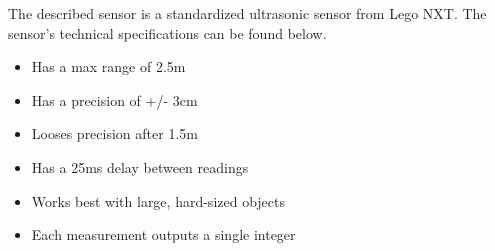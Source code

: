 
The described sensor is a standardized ultrasonic sensor from Lego NXT. The
sensor's technical specifications \citep{Ultrasonic_sensor} can be found below.
\begin{itemize}
  \item Has a max range of 2.5m
  \item Has a precision of +/- 3cm
  \item Looses precision after 1.5m
  \item Has a 25ms delay between readings
  \item Works best with large, hard-sized objects
  \item Each measurement outputs a single integer
\end{itemize}

% 













